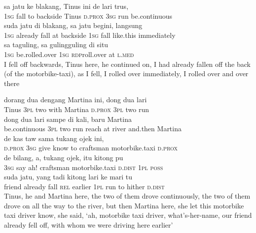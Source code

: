 \ea
\gll   sa    {jatu}    {ke}    {blakang,}   Tinus    {ini}    {de}   lari    {trus,}\\
  \textsc{1sg}    {fall}    {to}    {backside}   Tinus    {\textsc{d.prox}}    {\textsc{3sg}}   run    {be.continuous}\\
    {suda}    {jatu}   di    {blakang,}   sa    {jatu}    {begini,}   langsung\\
   {\textsc{1sg}}    {already}    {fall}   at    {backside}   \textsc{1sg}    {fall}    {like.this}   immediately\\
\gll   sa    {taguling,}    {sa}    {guling{\Tilde}guling}    {di}    {situ}\\
  \textsc{1sg}    {be.rolled.over}    {\textsc{1sg}}    {\textsc{rdp}{\Tilde}roll.over}    {at}    {\textsc{l.med}}\\
\glt
I fell off backwards, Tinus here, he continued on, I had already fallen off the back (of the motorbike-taxi), as I fell, I rolled over immediately, I rolled over and over there
\z

\ea
{}    {dorang}    {dua}    {dengang}    {Martina}    {ini,}    {dong}    {dua}    {lari}\\
   {Tinus}    {\textsc{3pl}}    {two}    {with}    {Martina}    {\textsc{d.prox}}    {\textsc{3pl}}    {two}    {run}\\
    {dong}    {dua}    {lari}    {sampe}   di    {kali,}    {baru}    {Martina}\\
   {be.continuous}    {\textsc{3pl}}    {two}    {run}    {reach}   at    {river}    {and.then}    {Martina}\\
   de    {kas}    {taw}    {sama}    {tukang}    {ojek}    {ini,}\\
   {\textsc{d.prox}}   \textsc{3sg}    {give}    {know}    {to}    {craftsman}    {motorbike.taxi}    {\textsc{d.prox}}\\
\gll  de    {bilang,}    {a,}    {tukang}    {ojek,}    {itu}    {kitong}   pu\\
  \textsc{3sg}    {say}    {ah!}    {craftsman}    {motorbike.taxi}    {\textsc{d.dist}}    {\textsc{1pl}}   \textsc{poss}\\
    {suda}    {jatu,}    {yang}    {tadi}    {kitong}    {lari}    {ke}    {mari}    {tu}\\
   {friend}    {already}    {fall}    {\textsc{rel}}    {earlier}    {\textsc{1pl}}    {run}    {to}    {hither}    {\textsc{d.dist}}\\
\glt
Tinus, he and Martina here, the two of them drove continuously, the two of them drove on all the way to the river, but then Martina here, she let this motorbike taxi driver know, she said, ‘ah, motorbike taxi driver, what’s-her-name, our friend already fell off, with whom we were driving here earlier’
\z

